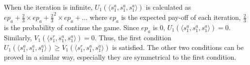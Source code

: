 \begin{itemize}
	    
\end{itemize}

When the iteration is infinite, $U_1(\langle s_1^a,s_1^a,s_1^a \rangle )$ is calculated as $ep_a + \frac{2}{3}\times ep_a + \frac{2}{3}^2 \times ep_a + \dots$
where $ep_a$ is the expected pay-off of each iteration, $\frac{2}{3}$ is the probability of continue the game. Since $ep_a$ is $0$, $U_1(\langle s_1^a,s_1^a,s_1^a \rangle )=0$. Similarly, $V_1(\langle s_1^r,s_1^a,s_1^a  \rangle )=0$. Thus, the first condition $U_1(\langle s_1^a,s_1^a,s_1^a \rangle ) \geq V_1(\langle s_1^r,s_1^a,s_1^a  \rangle )$ is satisfied. The other two conditions can be proved in a similar way, especially they are symmetrical to the first condition.





